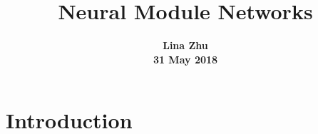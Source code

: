 \documentclass[a4paper,18pt]{article}
\author{\textbf{Lina Zhu}\\
	\textbf{31 May 2018}}
\title{\textbf{\bfseries \LARGE Neural Module Networks} }
\begin{document}
	
	\twocolumn
% 

%

\maketitle
\section{Introduction}
\end{document}
